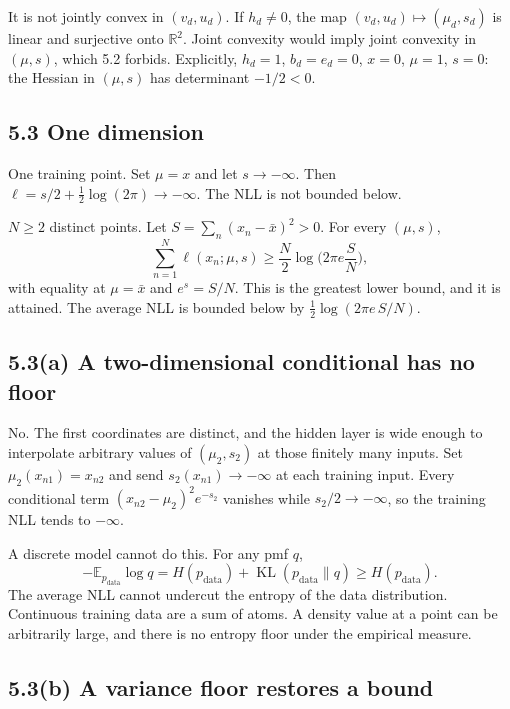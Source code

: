 \documentclass[11pt]{article}
\theoremstyle{remark}
\newcommand{\E}{\mathbb{E}}
\newcommand{\R}{\mathbb{R}}
\newcommand{\KL}{\operatorname{KL}}
\begin{document}
It is not jointly convex in \((v_d,u_d)\). If \(h_d\ne 0\), the map \((v_d,u_d)\mapsto(\mu_d,s_d)\) is linear and surjective onto \(\R^2\). Joint convexity would imply joint convexity in \((\mu,s)\), which 5.2 forbids. Explicitly, \(h_d=1\), \(b_d=e_d=0\), \(x=0\), \(\mu=1\), \(s=0\): the Hessian in \((\mu,s)\) has determinant \(-1/2<0\).

\subsection*{5.3 One dimension}

One training point. Set \(\mu=x\) and let \(s\to-\infty\). Then \(\ell=s/2+\tfrac12\log(2\pi)\to-\infty\). The NLL is not bounded below.

\(N\ge 2\) distinct points. Let \(S=\sum_n(x_n-\bar x)^2>0\). For every \((\mu,s)\),
\[
\sum_{n=1}^N\ell(x_n;\mu,s)\ge\frac N2\log\Big(2\pi e\frac{S}{N}\Big),
\]
with equality at \(\mu=\bar x\) and \(e^s=S/N\). This is the greatest lower bound, and it is attained. The average NLL is bounded below by \(\tfrac12\log(2\pi e\,S/N)\).

\subsection*{5.3(a) A two-dimensional conditional has no floor}

No. The first coordinates are distinct, and the hidden layer is wide enough to interpolate arbitrary values of \((\mu_2,s_2)\) at those finitely many inputs. Set \(\mu_2(x_{n1})=x_{n2}\) and send \(s_2(x_{n1})\to-\infty\) at each training input. Every conditional term \((x_{n2}-\mu_2)^2 e^{-s_2}\) vanishes while \(s_2/2\to-\infty\), so the training NLL tends to \(-\infty\).

A discrete model cannot do this. For any pmf \(q\),
\[
-\E_{p_{\mathrm{data}}}\log q=H(p_{\mathrm{data}})+\KL(p_{\mathrm{data}}\|q)\ge H(p_{\mathrm{data}}).
\]
The average NLL cannot undercut the entropy of the data distribution. Continuous training data are a sum of atoms. A density value at a point can be arbitrarily large, and there is no entropy floor under the empirical measure.

\subsection*{5.3(b) A variance floor restores a bound}
\end{document}

